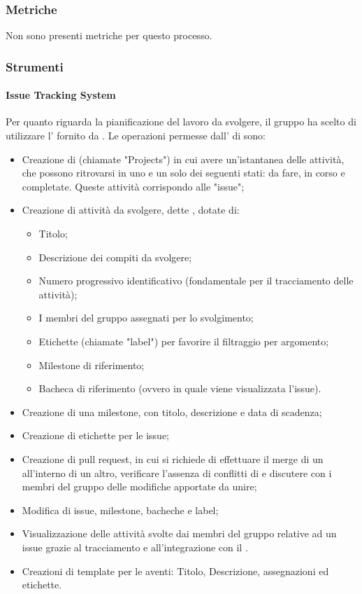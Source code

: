 \subsubsection{Metriche}
Non sono presenti metriche per questo processo.

\subsubsection{Strumenti}

\paragraph{Issue Tracking System}
Per quanto riguarda la pianificazione del lavoro da svolgere, il gruppo \Gruppo{} ha scelto di utilizzare l' fornito da .
Le operazioni permesse dall' di  sono:
\begin{itemize}
	\item Creazione di  (chiamate "Projects") in cui avere un'istantanea delle attività, che possono ritrovarsi in uno e un solo dei seguenti stati: da fare, in corso e completate. Queste attività corrispondo alle "issue";
	\item Creazione di attività da svolgere, dette , dotate di:
	\begin{itemize}
		\item Titolo;
		\item Descrizione dei compiti da svolgere;
		\item Numero progressivo identificativo (fondamentale per il tracciamento delle attività);
		\item I membri del gruppo assegnati per lo svolgimento;
		\item Etichette (chiamate "label") per favorire il filtraggio per argomento;
		\item Milestone di riferimento;
		\item Bacheca di riferimento (ovvero in quale  viene visualizzata l'issue).
	\end{itemize}
	\item Creazione di una milestone, con titolo, descrizione e data di scadenza;
	\item Creazione di etichette per le issue;
	\item Creazione di pull request, in cui si richiede di effettuare il merge di un  all'interno di un altro, verificare l'assenza di conflitti di  e discutere con i membri del gruppo delle modifiche apportate da unire;
	\item Modifica di issue, milestone, bacheche e label;
	\item Visualizzazione delle attività svolte dai membri del gruppo relative ad un issue grazie al tracciamento e all'integrazione con il  .
	\item Creazioni di template per le  aventi: Titolo, Descrizione, assegnazioni ed etichette.
\end{itemize}
